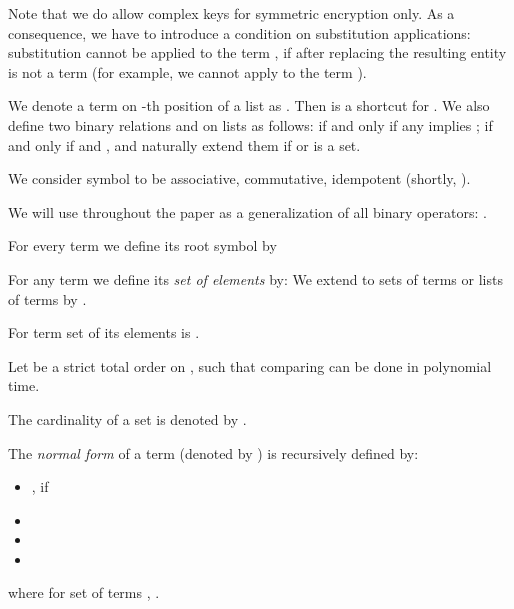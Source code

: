 Note that we do allow complex keys for symmetric encryption only.
As a consequence, we have to introduce a condition on substitution applications: 
substitution  cannot be applied to the term , if after replacing the resulting entity is not a term 
(for example, we cannot apply  to the term ).




We denote a term on -th position of a list  as . 
Then  is a shortcut for . 
We also define two binary relations  and  on lists as follows:
 if and only if  any  implies  ;
 if and only if  and ,
and naturally extend them if  or  is a set. 

\begin{df}
We consider symbol  to be 
	associative,
	commutative,
	idempotent
(shortly, ).
\end{df}

We will use  throughout the paper as a generalization of all binary operators: .

\begin{df}

 For every term  we define its root symbol by 


\end{df}






\begin{df}\label{def:elems}
	For any term  we define its \emph{set of elements} by:
We extend  to sets of terms or lists of terms  by . 
\end{df}
	
	
\begin{example}\label{ex:term}
 For term 
set of its elements is .
\end{example}





\begin{df}
Let  be a strict total order 
on ,
such that comparing can be done in polynomial time. 

\end{df}

\begin{df}
The cardinality of a  set   is denoted by .
\end{df}


\begin{df} \label{def:norm}
The \emph{normal form} of a term  (denoted by ) is recursively defined by:
\begin{itemize}
	\item , if 
	\item \item 
	\item 
\SHORT{
	
}\LONG{
	
}

\end{itemize}
where for set of terms , .
	
\end{df}

